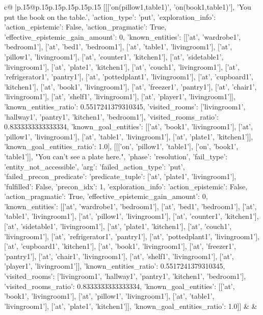 \documentclass{article}
\begin{document}
{\begin{supertabular}{c@{$\;$}|p{.15\linewidth}@{}p{.15\linewidth}p{.15\linewidth}p{.15\linewidth}p{.15\linewidth}p{.15\linewidth}}
{{{	 [[['on(pillow1,table1)', 'on(book1,table1)'], 'You put the book on the table.', {'action_type': 'put', 'exploration_info': {'action_epistemic': False, 'action_pragmatic': True, 'effective_epistemic_gain_amount': 0, 'known_entities': [['at', 'wardrobe1', 'bedroom1'], ['at', 'bed1', 'bedroom1'], ['at', 'table1', 'livingroom1'], ['at', 'pillow1', 'livingroom1'], ['at', 'counter1', 'kitchen1'], ['at', 'sidetable1', 'livingroom1'], ['at', 'plate1', 'kitchen1'], ['at', 'couch1', 'livingroom1'], ['at', 'refrigerator1', 'pantry1'], ['at', 'pottedplant1', 'livingroom1'], ['at', 'cupboard1', 'kitchen1'], ['at', 'book1', 'livingroom1'], ['at', 'freezer1', 'pantry1'], ['at', 'chair1', 'livingroom1'], ['at', 'shelf1', 'livingroom1'], ['at', 'player1', 'livingroom1']], 'known_entities_ratio': 0.5517241379310345, 'visited_rooms': ['livingroom1', 'hallway1', 'pantry1', 'kitchen1', 'bedroom1'], 'visited_rooms_ratio': 0.8333333333333334, 'known_goal_entities': [['at', 'book1', 'livingroom1'], ['at', 'pillow1', 'livingroom1'], ['at', 'table1', 'livingroom1'], ['at', 'plate1', 'kitchen1']], 'known_goal_entities_ratio': 1.0}}], [[['on', 'pillow1', 'table1'], ['on', 'book1', 'table1']], "You can't see a plate here.", {'phase': 'resolution', 'fail_type': 'entity_not_accessible', 'arg': {'failed_action_type': 'put', 'failed_precon_predicate': {'predicate_tuple': ['at', 'plate1', 'livingroom1'], 'fulfilled': False, 'precon_idx': 1}}, 'exploration_info': {'action_epistemic': False, 'action_pragmatic': True, 'effective_epistemic_gain_amount': 0, 'known_entities': [['at', 'wardrobe1', 'bedroom1'], ['at', 'bed1', 'bedroom1'], ['at', 'table1', 'livingroom1'], ['at', 'pillow1', 'livingroom1'], ['at', 'counter1', 'kitchen1'], ['at', 'sidetable1', 'livingroom1'], ['at', 'plate1', 'kitchen1'], ['at', 'couch1', 'livingroom1'], ['at', 'refrigerator1', 'pantry1'], ['at', 'pottedplant1', 'livingroom1'], ['at', 'cupboard1', 'kitchen1'], ['at', 'book1', 'livingroom1'], ['at', 'freezer1', 'pantry1'], ['at', 'chair1', 'livingroom1'], ['at', 'shelf1', 'livingroom1'], ['at', 'player1', 'livingroom1']], 'known_entities_ratio': 0.5517241379310345, 'visited_rooms': ['livingroom1', 'hallway1', 'pantry1', 'kitchen1', 'bedroom1'], 'visited_rooms_ratio': 0.8333333333333334, 'known_goal_entities': [['at', 'book1', 'livingroom1'], ['at', 'pillow1', 'livingroom1'], ['at', 'table1', 'livingroom1'], ['at', 'plate1', 'kitchen1']], 'known_goal_entities_ratio': 1.0}}]] 
	  } 
	   } 
	   } 
	 & & \\ 
 

    \theutterance {}  


\end{supertabular}}
\end{document}
